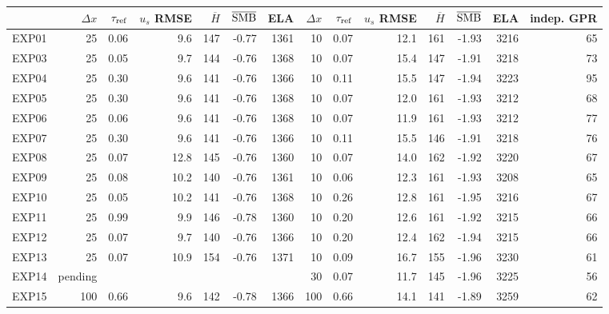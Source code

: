 \begin{tabular}{l|rrrrrr|rrrrrrr}
\toprule
 & $\Delta x$ & $\tau_{\rm ref}$ & $u_s$ RMSE & $\overline{H}$ & $\overline{\rm SMB}$ & ELA & $\Delta x$ & $\tau_{\rm ref}$ & $u_s$ RMSE & $\overline{H}$ & $\overline{\rm SMB}$ & ELA & indep. GPR \\
\midrule
EXP01 & 25 & 0.06 & 9.6 & 147 & -0.77 & 1361 & 10 & 0.07 & 12.1 & 161 & -1.93 & 3216 & 65 \\
EXP03 & 25 & 0.05 & 9.7 & 144 & -0.76 & 1368 & 10 & 0.07 & 15.4 & 147 & -1.91 & 3218 & 73 \\
EXP04 & 25 & 0.30 & 9.6 & 141 & -0.76 & 1366 & 10 & 0.11 & 15.5 & 147 & -1.94 & 3223 & 95 \\
EXP05 & 25 & 0.30 & 9.6 & 141 & -0.76 & 1368 & 10 & 0.07 & 12.0 & 161 & -1.93 & 3212 & 68 \\
EXP06 & 25 & 0.06 & 9.6 & 141 & -0.76 & 1368 & 10 & 0.07 & 11.9 & 161 & -1.93 & 3212 & 77 \\
EXP07 & 25 & 0.30 & 9.6 & 141 & -0.76 & 1366 & 10 & 0.11 & 15.5 & 146 & -1.91 & 3218 & 76 \\
EXP08 & 25 & 0.07 & 12.8 & 145 & -0.76 & 1360 & 10 & 0.07 & 14.0 & 162 & -1.92 & 3220 & 67 \\
EXP09 & 25 & 0.08 & 10.2 & 140 & -0.76 & 1361 & 10 & 0.06 & 12.3 & 161 & -1.93 & 3208 & 65 \\
EXP10 & 25 & 0.05 & 10.2 & 141 & -0.76 & 1368 & 10 & 0.26 & 12.8 & 161 & -1.95 & 3216 & 67 \\
EXP11 & 25 & 0.99 & 9.9 & 146 & -0.78 & 1360 & 10 & 0.20 & 12.6 & 161 & -1.92 & 3215 & 66 \\
EXP12 & 25 & 0.07 & 9.7 & 140 & -0.76 & 1366 & 10 & 0.20 & 12.4 & 162 & -1.94 & 3215 & 66 \\
EXP13 & 25 & 0.07 & 10.9 & 154 & -0.76 & 1371 & 10 & 0.09 & 16.7 & 155 & -1.96 & 3230 & 61 \\
EXP14 & pending &  &  &  &  &  & 30 & 0.07 & 11.7 & 145 & -1.96 & 3225 & 56 \\
EXP15 & 100 & 0.66 & 9.6 & 142 & -0.78 & 1366 & 100 & 0.66 & 14.1 & 141 & -1.89 & 3259 & 62 \\
\bottomrule
\end{tabular}
